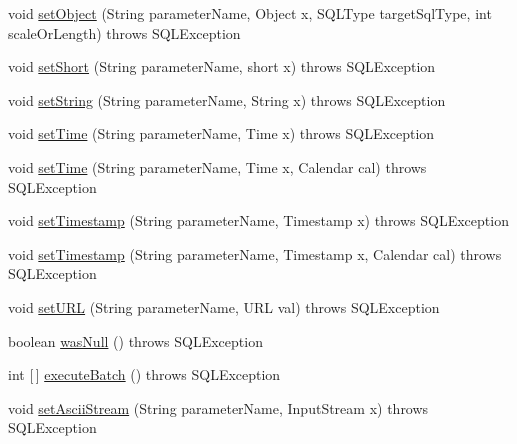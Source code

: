 \begin{DoxyCompactItemize}
\item 
void \mbox{\hyperlink{classcom_1_1mysql_1_1cj_1_1jdbc_1_1_callable_statement_a857ad3f2a98d42fb3fd2c19d5134f23f}{set\+Object}} (String parameter\+Name, Object x, S\+Q\+L\+Type target\+Sql\+Type, int scale\+Or\+Length)  throws S\+Q\+L\+Exception 
\item 
void \mbox{\hyperlink{classcom_1_1mysql_1_1cj_1_1jdbc_1_1_callable_statement_a3e077220a5f501fd6a1455055ac27aa5}{set\+Short}} (String parameter\+Name, short x)  throws S\+Q\+L\+Exception 
\item 
void \mbox{\hyperlink{classcom_1_1mysql_1_1cj_1_1jdbc_1_1_callable_statement_a31f6dfa1f9643a1b4ed3efd57d00bc2b}{set\+String}} (String parameter\+Name, String x)  throws S\+Q\+L\+Exception 
\item 
void \mbox{\hyperlink{classcom_1_1mysql_1_1cj_1_1jdbc_1_1_callable_statement_abaeaf443ba9998c9378de127b63c4eaa}{set\+Time}} (String parameter\+Name, Time x)  throws S\+Q\+L\+Exception 
\item 
void \mbox{\hyperlink{classcom_1_1mysql_1_1cj_1_1jdbc_1_1_callable_statement_ab2ce9627abfa776a9a481cc4f496d2ae}{set\+Time}} (String parameter\+Name, Time x, Calendar cal)  throws S\+Q\+L\+Exception 
\item 
void \mbox{\hyperlink{classcom_1_1mysql_1_1cj_1_1jdbc_1_1_callable_statement_a5032ac718b4fbbb1cfd23077cc37ec20}{set\+Timestamp}} (String parameter\+Name, Timestamp x)  throws S\+Q\+L\+Exception 
\item 
void \mbox{\hyperlink{classcom_1_1mysql_1_1cj_1_1jdbc_1_1_callable_statement_adeaf8f538114ab776d3f9063134709a7}{set\+Timestamp}} (String parameter\+Name, Timestamp x, Calendar cal)  throws S\+Q\+L\+Exception 
\item 
void \mbox{\hyperlink{classcom_1_1mysql_1_1cj_1_1jdbc_1_1_callable_statement_ad9619f612112c6427341179cd909a058}{set\+U\+RL}} (String parameter\+Name, U\+RL val)  throws S\+Q\+L\+Exception 
\item 
boolean \mbox{\hyperlink{classcom_1_1mysql_1_1cj_1_1jdbc_1_1_callable_statement_a49a33a86678de625aaf3d944363eb7d5}{was\+Null}} ()  throws S\+Q\+L\+Exception 
\item 
int \mbox{[}$\,$\mbox{]} \mbox{\hyperlink{classcom_1_1mysql_1_1cj_1_1jdbc_1_1_callable_statement_ad2aca8b3dc5657731e6015075cea280d}{execute\+Batch}} ()  throws S\+Q\+L\+Exception 
\item 
void \mbox{\hyperlink{classcom_1_1mysql_1_1cj_1_1jdbc_1_1_callable_statement_ab80d76a28a17c36b707a575291016da0}{set\+Ascii\+Stream}} (String parameter\+Name, Input\+Stream x)  throws S\+Q\+L\+Exception 

\end{DoxyCompactItemize}

